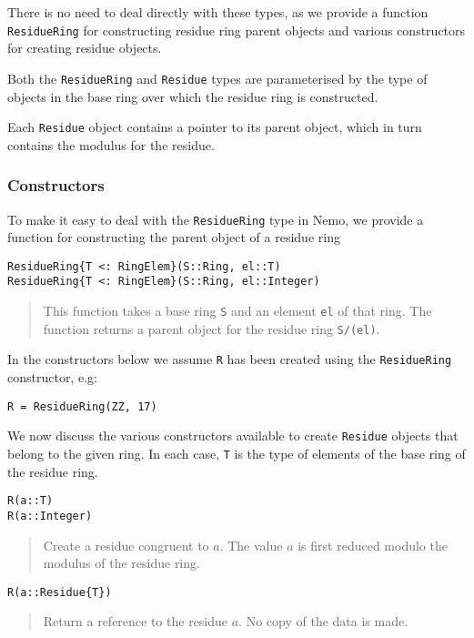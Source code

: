 \documentclass[a4paper,10pt]{article}
\newcommand{\code}{\lstinline}
\newcommand{\desc}[1]{\vspace{-3mm}\begin{quote}#1\end{quote}}
\begin{document}
There is no need to deal directly with these types, as we provide a function
\code{ResidueRing} for constructing residue ring parent objects and various
constructors for creating residue objects.

Both the \code{ResidueRing} and \code{Residue} types are parameterised by the
type of objects in the base ring over which the residue ring is constructed.

Each \code{Residue} object contains a pointer to its parent object, which in
turn contains the modulus for the residue.

\subsubsection{Constructors}

To make it easy to deal with the \code{ResidueRing} type in Nemo, we provide a
function for constructing the parent object of a residue ring

\begin{lstlisting}
ResidueRing{T <: RingElem}(S::Ring, el::T)
ResidueRing{T <: RingElem}(S::Ring, el::Integer)
\end{lstlisting}

\desc{This function takes a base ring \code{S} and an element \code{el} of that
ring. The function returns a parent object for the residue ring \code{S/(el)}.}

In the constructors below we assume \code{R} has been created using the 
\code{ResidueRing} constructor, e.g:

\begin{lstlisting}
R = ResidueRing(ZZ, 17)
\end{lstlisting}

We now discuss the various constructors available to create \code{Residue}
objects that belong to the given ring. In each case, \code{T} is the type of
elements of the base ring of the residue ring.

\begin{lstlisting}
R(a::T)
R(a::Integer)  
\end{lstlisting}

\desc{Create a residue congruent to $a$. The value $a$ is first reduced
modulo the modulus of the residue ring.}

\begin{lstlisting}
R(a::Residue{T})  
\end{lstlisting}

\desc{Return a reference to the residue $a$. No copy of the data is made.}
\end{document}
